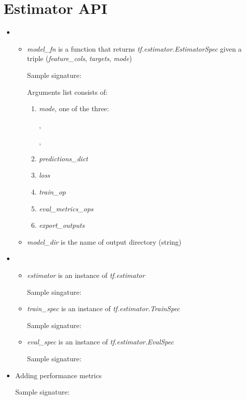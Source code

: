 \documentclass[12pt]{article}
\begin{document}
\section{Estimator API}
\href{https://www.tensorflow.org/guide/estimators}{}
\begin{itemize}
  \item {}
  \begin{itemize}
    \item \emph{model\_fn} is a function that returns \emph{tf.estimator.EstimatorSpec} given a triple (\emph{feature\_cols}, \emph{targets}, \emph{mode})

    Sample signature: 

    Arguments list consists of:
    \begin{enumerate}
      \item \emph{mode}, one of the three:

       ,

        ,

      \item \emph{predictions\_dict}
      \item \emph{loss}
      \item \emph{train\_op}
      \item \emph{eval\_metrics\_ops}
      \item \emph{export\_outputs}
    \end{enumerate}
    \item \emph{model\_dir} is the name of output directory (string)
  \end{itemize}
  \item {}
    \begin{itemize}
      \item \emph{estimator} is an instance of \emph{tf.estimator}

      Sample singature: 
      \item \emph{train\_spec} is an instance of \emph{tf.estimator.TrainSpec}

      Sample signature: 
      \item \emph{eval\_spec} is an instance of \emph{tf.estimator.EvalSpec}

      Sample signature: 
    \end{itemize}
    \item Adding performance metrics

    Sample signature:
\end{itemize}
\end{document}
